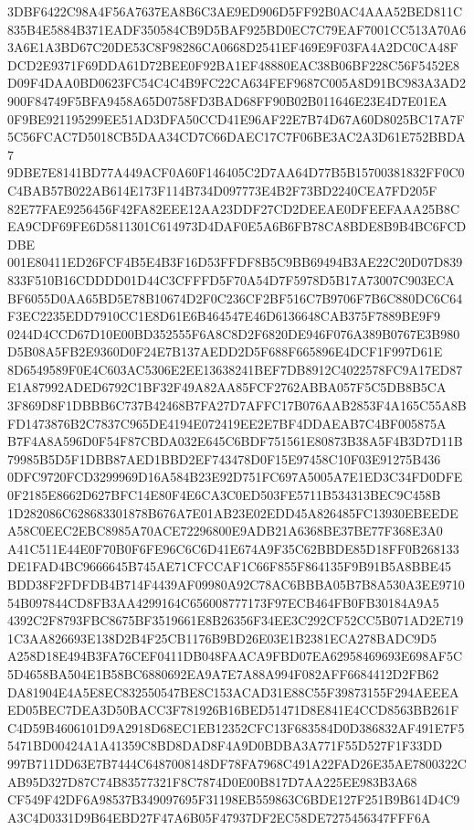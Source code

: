 \documentclass[UTF8,fontset=fandol,zihao=-4,a4paper]{ctexart}
\begin{document}
{{3DBF6422C98A4F56A7637EA8B6C3AE9ED906D5FF92B0AC4AAA52BED811C835B4E5884B371EADF350584CB9D5BAF925BD0EC7C79EAF7001CC513A70A6
3A6E1A3BD67C20DE53C8F98286CA0668D2541EF469E9F03FA4A2DC0CA48FDCD2E9371F69DDA61D72BEE0F92BA1EF48880EAC38B06BF228C56F5452E8
D09F4DAA0BD0623FC54C4C4B9FC22CA634FEF9687C005A8D91BC983A3AD2900F84749F5BFA9458A65D0758FD3BAD68FF90B02B011646E23E4D7E01EA
0F9BE921195299EE51AD3DFA50CCD41E96AF22E7B74D67A60D8025BC17A7F5C56FCAC7D5018CB5DAA34CD7C66DAEC17C7F06BE3AC2A3D61E752BBDA7
9DBE7E8141BD77A449ACF0A60F146405C2D7AA64D77B5B15700381832FF0C0C4BAB57B022AB614E173F114B734D097773E4B2F73BD2240CEA7FD205F
82E77FAE9256456F42FA82EEE12AA23DDF27CD2DEEAE0DFEEFAAA25B8CEA9CDF69FE6D5811301C614973D4DAF0E5A6B6FB78CA8BDE8B9B4BC6FCDDBE
001E80411ED26FCF4B5E4B3F16D53FFDF8B5C9BB69494B3AE22C20D07D839833F510B16CDDDD01D44C3CFFFD5F70A54D7F5978D5B17A73007C903ECA
BF6055D0AA65BD5E78B10674D2F0C236CF2BF516C7B9706F7B6C880DC6C64F3EC2235EDD7910CC1E8D61E6B464547E46D6136648CAB375F7889BE9F9
0244D4CCD67D10E00BD352555F6A8C8D2F6820DE946F076A389B0767E3B980D5B08A5FB2E9360D0F24E7B137AEDD2D5F688F665896E4DCF1F997D61E
8D6549589F0E4C603AC5306E2EE13638241BEF7DB8912C4022578FC9A17ED87E1A87992ADED6792C1BF32F49A82AA85FCF2762ABBA057F5C5DB8B5CA
3F869D8F1DBBB6C737B42468B7FA27D7AFFC17B076AAB2853F4A165C55A8BFD1473876B2C7837C965DE4194E072419EE2E7BF4DDAEAB7C4BF005875A
B7F4A8A596D0F54F87CBDA032E645C6BDF751561E80873B38A5F4B3D7D11B79985B5D5F1DBB87AED1BBD2EF743478D0F15E97458C10F03E91275B436
0DFC9720FCD3299969D16A584B23E92D751FC697A5005A7E1ED3C34FD0DFE0F2185E8662D627BFC14E80F4E6CA3C0ED503FE5711B534313BEC9C458B
1D282086C628683301878B676A7E01AB23E02EDD45A826485FC13930EBEEDEA58C0EEC2EBC8985A70ACE72296800E9ADB21A6368BE37BE77F368E3A0
A41C511E44E0F70B0F6FE96C6C6D41E674A9F35C62BBDE85D18FF0B268133DE1FAD4BC9666645B745AE71CFCCAF1C66F855F864135F9B91B5A8BBE45
BDD38F2FDFDB4B714F4439AF09980A92C78AC6BBBA05B7B8A530A3EE971054B097844CD8FB3AA4299164C656008777173F97ECB464FB0FB30184A9A5
4392C2F8793FBC8675BF3519661E8B26356F34EE3C292CF52CC5B071AD2E7191C3AA826693E138D2B4F25CB1176B9BD26E03E1B2381ECA278BADC9D5
A258D18E494B3FA76CEF0411DB048FAACA9FBD07EA62958469693E698AF5C5D4658BA504E1B58BC6880692EA9A7E7A88A994F082AFF6684412D2FB62
DA81904E4A5E8EC832550547BE8C153ACAD31E88C55F39873155F294AEEEAED05BEC7DEA3D50BACC3F781926B16BED51471D8E841E4CCD8563BB261F
C4D59B4606101D9A2918D68EC1EB12352CFC13F683584D0D386832AF491E7F55471BD00424A1A41359C8BD8DAD8F4A9D0BDBA3A771F55D527F1F33DD
997B711DD63E7B7444C6487008148DF78FA7968C491A22FAD26E35AE7800322CAB95D327D87C74B83577321F8C7874D0E00B817D7AA225EE983B3A68
CF549F42DF6A98537B349097695F31198EB559863C6BDE127F251B9B614D4C9A3C4D0331D9B64EBD27F47A6B05F47937DF2EC58DE7275456347FFF6A
}}
\end{document}
